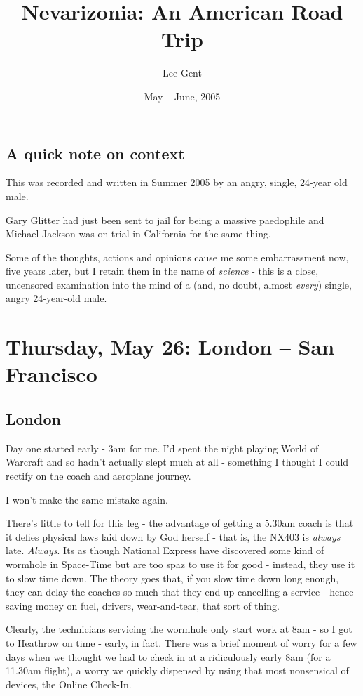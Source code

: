 \documentclass[a5paper,titlepage,draft]{book}
\title{Nevarizonia: An American Road Trip}
\author{Lee Gent}
\date{May -- June, 2005}
\begin{document}
\frontmatter
\maketitle
\section*{A quick note on context}
This was recorded and written in Summer 2005 by an angry, single, 24-year old male.

Gary Glitter had just been sent to jail for being a massive paedophile and Michael Jackson was on trial in California for the same thing.

Some of the thoughts, actions and opinions cause me some embarrassment now, five years later, but I retain them in the name of \emph{science} - this is a close, uncensored examination into the mind of a (and, no doubt, almost \emph{every}) single, angry 24-year-old male.

\mainmatter
\chapter[London -- San Francisco]{Thursday, May 26: London -- San Francisco}
\section*{London}
Day one started early - 3am for me.  I'd spent the night playing World of Warcraft and so hadn't actually slept much at all - something I thought I could rectify on the coach and aeroplane journey.

I won't make the same mistake again.

There's little to tell for this leg - the advantage of getting a 5.30am coach is that it defies physical laws laid down by God herself - that is, the NX403 is \emph{always} late.  \emph{Always}.  Its as though National Express have discovered some kind of wormhole in Space-Time but are too spaz to use it for good - instead, they use it to slow time down.  The theory goes that, if you slow time down long enough, they can delay the coaches so much that they end up cancelling a service - hence saving money on fuel, drivers, wear-and-tear, that sort of thing.

Clearly, the technicians servicing the wormhole only start work at 8am - so I got to Heathrow on time - early, in fact.  There was a brief moment of worry for a few days when we thought we had to check in at a ridiculously early 8am (for a 11.30am flight), a worry we quickly dispensed by using that most nonsensical of devices, the Online Check-In.
\end{document}
